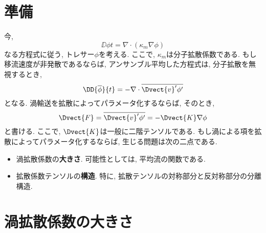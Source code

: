 \section{準備}
今, 
\begin{equation}
  \DD{\phi}{t} = \nabla \cdot (\kappa_m \nabla \phi)
\end{equation}
なる方程式に従う, トレサー$\phi$を考える. 
ここで, $\kappa_m$は分子拡散係数である. 
もし移流速度が非発散であるならば, アンサンブル平均した方程式は, 
分子拡散を無視するとき, 
\begin{equation}
  \DD{\overline{\phi}}{t} = - \nabla \cdot \overline{\Dvect{v}' \phi'}
\end{equation}
となる. 
渦輸送を拡散によってパラメータ化するならば, そのとき, 
\begin{equation}
  \Dvect{F} = \overline{\Dvect{v}' \phi'}
            = - \Dvect{K} \nabla \phi
\end{equation}
と書ける. 
ここで, $\Dvect{K}$は一般に二階テンソルである. 
もし渦による項を拡散によってパラメータ化するならば, 
生じる問題は次の二点である. 
\begin{itemize}
 \item 渦拡散係数の\textbf{大きさ}. 可能性としては, 平均流の関数である. 
 \item 拡散係数テンソルの\textbf{構造}. 特に, 拡散テンソルの対称部分と反対称部分の分離構造. 
\end{itemize}

\section{渦拡散係数の大きさ}

